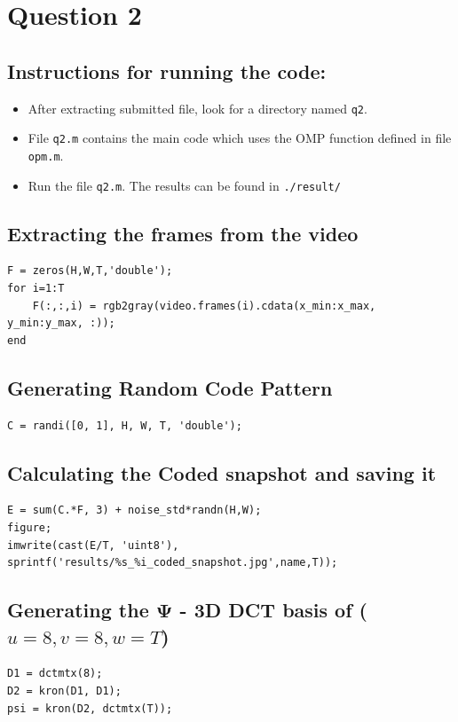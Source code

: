\documentclass[fleqn, 11pt]{article}
\begin{document}
\newpage
\section*{Question 2}
\setcounter{equation}{0}

\subsection*{Instructions for running the code:}
\begin{itemize}[noitemsep]
    \item After extracting submitted file, look for a directory named \texttt{q2}.
    \item File \texttt{q2.m} contains the main code which uses the OMP function defined in file \texttt{opm.m}.
    \item Run the file \texttt{q2.m}. The results can be found in \texttt{./result/}
\end{itemize}

\subsection*{Extracting the frames from the video}
\begin{verbatim}
F = zeros(H,W,T,'double');
for i=1:T
    F(:,:,i) = rgb2gray(video.frames(i).cdata(x_min:x_max, y_min:y_max, :));
end
\end{verbatim}

\subsection*{Generating Random Code Pattern}
\begin{verbatim}
C = randi([0, 1], H, W, T, 'double');
\end{verbatim}

\subsection*{Calculating the Coded snapshot and saving it}
\begin{verbatim}
E = sum(C.*F, 3) + noise_std*randn(H,W);
figure;
imwrite(cast(E/T, 'uint8'), sprintf('results/%s_%i_coded_snapshot.jpg',name,T));
\end{verbatim}

\subsection*{Generating the $\boldsymbol{\Psi}$ - 3D DCT basis of ($u=8, v=8, w=T$)}
\begin{verbatim}
D1 = dctmtx(8);
D2 = kron(D1, D1);
psi = kron(D2, dctmtx(T));
\end{verbatim}
\end{document}
